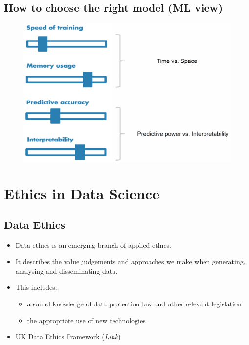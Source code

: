 \documentclass[a4paper]{article}
\begin{document}
		\subsection{How to choose the right model (ML view)}
		
		\begin{figure}[htb!]
			\centering
			\includegraphics[width=\textwidth]{img/sw09/right_model.png}
		\end{figure}
	
	\newpage
	
	\section{Ethics in Data Science}
	
		\subsection{Data Ethics}
		
		\begin{itemize}
			\item Data ethics is an emerging branch of applied ethics.
			\item It describes the value judgements and approaches we make when generating, analysing and disseminating data.
			\item This includes:
				\begin{itemize}
					\item a sound knowledge of data protection law and other relevant legislation
					\item the appropriate use of new technologies
				\end{itemize}
			\item UK Data Ethics Framework (\href{https://assets.publishing.service.gov.uk/government/uploads/system/uploads/attachment_data/file/737137/Data_Ethics_Framework.pdf}{\textit{\underline{Link}}})
		\end{itemize}
	
\end{document}

